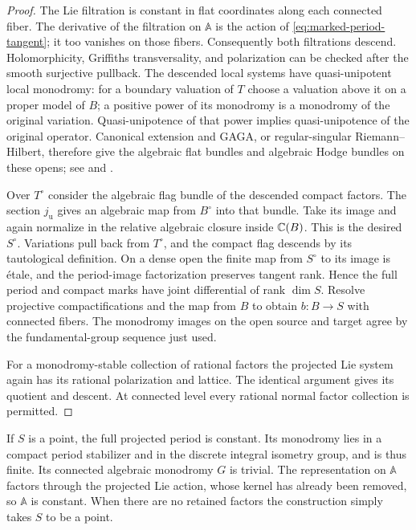 \begin{proof}
The Lie filtration is constant in flat coordinates along each
connected fiber.  The derivative of the filtration on
$\mathbb A$ is the action of
\eqref{eq:marked-period-tangent}; it too vanishes on those
fibers.  Consequently both filtrations descend.  Holomorphicity,
Griffiths transversality, and polarization can be checked after
the smooth surjective pullback.  The descended local systems
have quasi-unipotent local monodromy: for a boundary valuation
of $T$ choose a valuation above it on a proper model of $B$;
a positive power of its monodromy is a monodromy of the original
variation.  Quasi-unipotence of that power implies
quasi-unipotence of the original operator.  Canonical extension
and GAGA, or regular-singular Riemann--Hilbert, therefore give
the algebraic flat bundles and algebraic Hodge bundles on these
opens; see \cite[Chapter~II]{DeligneRSE} and
.

Over $T^\circ$ consider the algebraic flag bundle of the
descended compact factors.  The section $j_{\mathrm u}$ gives
an algebraic map from $B^\circ$ into that bundle.  Take its
image and again normalize in the relative algebraic closure
inside $\mathbb C(B)$.  This is the desired $S^\circ$.  Variations
pull back from $T^\circ$, and the compact flag descends by its
tautological definition.  On a dense open the finite map from
$S^\circ$ to its image is étale, and the period-image
factorization preserves tangent rank.  Hence the full period
and compact marks have joint differential of rank $\dim S$.
Resolve projective compactifications and the map from $B$ to
obtain $b:B\to S$ with connected fibers.  The monodromy images
on the open source and target agree by the fundamental-group
sequence just used.

For a monodromy-stable collection of rational factors the
projected Lie system again has its rational polarization and
lattice.  The identical argument gives its quotient and
descent.  At connected level every rational normal factor
collection is permitted.
\end{proof}

\label{proof:point-period}
If $S$ is a point, the full projected period is constant.
Its monodromy lies in a compact period stabilizer and in the
discrete integral isometry group, and is thus finite.  Its
connected algebraic monodromy $G$ is trivial.  The representation
on $\mathbb A$ factors through the projected Lie action, whose
kernel has already been removed, so $\mathbb A$ is constant.
When there are no retained factors the construction simply takes
$S$ to be a point.

